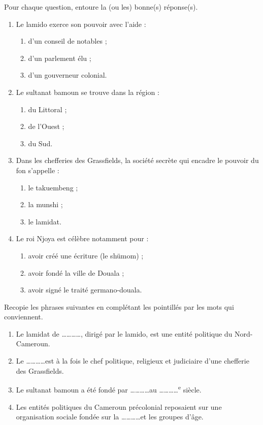 \documentclass[11pt]{article}
\begin{document}
\begin{exercice}[QCM]
Pour chaque question, entoure la (ou les) bonne(s) réponse(s).
\begin{enumerate}
\item Le lamido exerce son pouvoir avec l'aide :
\begin{enumerate}
\item[a)] d'un conseil de notables ;
\item[b)] d'un parlement élu ;
\item[c)] d'un gouverneur colonial.
\end{enumerate}
\item Le sultanat bamoun se trouve dans la région :
\begin{enumerate}
\item[a)] du Littoral ;
\item[b)] de l'Ouest ;
\item[c)] du Sud.
\end{enumerate}
\item Dans les chefferies des Grassfields, la société secrète qui encadre le pouvoir du fon s'appelle :
\begin{enumerate}
\item[a)] le takuembeng ;
\item[b)] la munshi ;
\item[c)] le lamidat.
\end{enumerate}
\item Le roi Njoya est célèbre notamment pour :
\begin{enumerate}
\item[a)] avoir créé une écriture (le shümom) ;
\item[b)] avoir fondé la ville de Douala ;
\item[c)] avoir signé le traité germano-douala.
\end{enumerate}
\end{enumerate}
\end{exercice}

\begin{exercice}
Recopie les phrases suivantes en complétant les pointillés par les mots qui conviennent.
\begin{enumerate}
\item Le lamidat de \ldots\ldots\ldots\ldots, dirigé par le lamido, est une entité politique du Nord-Cameroun.
\item Le \ldots\ldots\ldots\ldots est à la fois le chef politique, religieux et judiciaire d'une chefferie des Grassfields.
\item Le sultanat bamoun a été fondé par \ldots\ldots\ldots\ldots au \ldots\ldots\ldots\ldots\textsuperscript{e} siècle.
\item Les entités politiques du Cameroun précolonial reposaient sur une organisation sociale fondée sur la \ldots\ldots\ldots\ldots et les groupes d'âge.
\end{enumerate}
\end{exercice}
\end{document}
